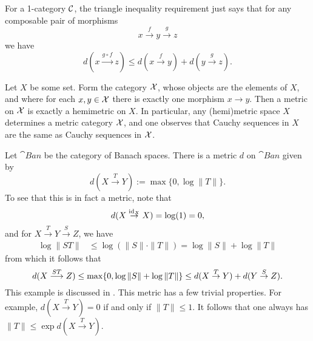 \begin{remark}
	For a 1-category \(\mathcal{C}\), the triangle inequality requirement just says that for any composable pair of morphisms
	\[ x \overset{f}\to y \overset{g}\to z \]
	we have
	\[ d(x\overset{g\circ f}\to z) \leq d(x\overset{f}\to y) + d(y\overset{g}\to z). \]
\end{remark}
\begin{example}
	Let \(X\) be some set. Form the category \(\mathcal{X}\), whose objects are the elements of \(X\), and where for each \(x,y\in\mathcal{X}\) there is exactly
	one morphism \(x\to y\). Then a metric on \(\mathcal{X}\) is exactly a hemimetric on \(X\). In particular, any (hemi)metric space \(X\) determines a
	metric category \(\mathcal{X}\), and one observes that Cauchy sequences in \(X\) are the same as Cauchy sequences in \(\mathcal{X}\).
\end{example}
\begin{example}
	Let \(\cat{Ban}\) be the category of Banach spaces. There is a metric \(d\) on \(\cat{Ban}\) given by
	\[ d(X \overset{T}\to Y) := \max\{0,\log\|T\|\}. \]
	To see that this is in fact a metric, note that
	\[ d(X\overset{\mathrm{id}_X}\to X) = \log(1) = 0, \]
	 and for \(X \overset{T}\to Y\overset{S}\to Z\), we have
	 \begin{align*}
	 	\log\|ST\| &\leq \log(\|S\|\cdot\|T\|) = \log\|S\| + \log\|T\|
	 \end{align*}
	 from which it follows that
	 \[ d(X\overset{ST}{\longrightarrow} Z) \leq \max\{0, \log\|S\| + \log\|T\|\} \leq d(X\overset{T}\to Y) + d(Y\overset{S}\to Z). \]
	 This example is discussed in \cite[§8]{clementino2024cauchyconvergencevnormedcategories}. This metric has a few trivial properties. For example, \(d(X\overset{T}\to Y)=0\)
	 if and only if \(\|T\|\leq 1\). It follows that one always has \(\|T\| \leq \exp{d(X\overset{T}\to Y)} \).
\end{example}

